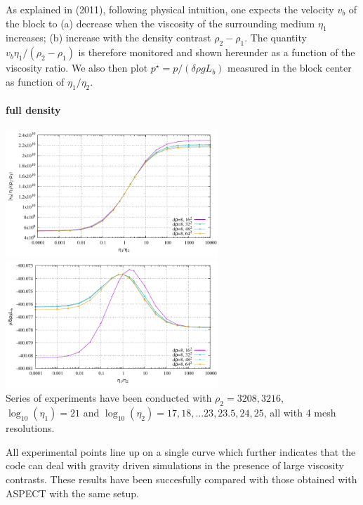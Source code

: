 As explained in \textcite{thie11} (2011), following physical intuition, one expects 
the velocity $v_b$ of the block to (a) decrease when the viscosity
of the surrounding medium $\eta_1$ increases; (b) increase with the
density contrast $\rho_2-\rho_1$. 
The quantity $v_b \eta_1/(\rho_2-\rho_1)$ is therefore monitored and shown hereunder as a function of 
the viscosity ratio.
We also then plot $p^\star=p/(\delta \rho g L_b)$ measured in the block center 
as function of $\eta_1/\eta_2$. 

\paragraph{full density}

\begin{center}
\includegraphics[width=8cm]{python_codes/fieldstone_53/results/full/results_v.pdf}
\includegraphics[width=8cm]{python_codes/fieldstone_53/results/full/results_p.pdf}\\
{\captionfont
Series of experiments have been conducted with $\rho_2=3208,3216$, 
$\log_{10}(\eta_1)=21$ and $\log_{10}(\eta_2)=17,18,...23,23.5,24,25$, 
all with 4 mesh resolutions.}
 \end{center}

All experimental points line up on a single curve which further
indicates that the code can deal with gravity driven simulations in the presence
of large viscosity contrasts. These results have been succesfully compared with 
those obtained with ASPECT with the same setup.


